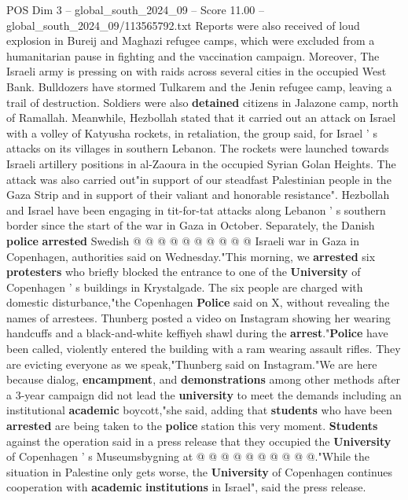 \begin{textsample}{POS Dim 3 – global\_south\_2024\_09 – Score 11.00 – global\_south\_2024\_09/113565792.txt}  \label{ex:f3_pos_329}
Reports were also received of loud explosion in Bureij and Maghazi refugee camps, which were excluded from a humanitarian pause in fighting and the vaccination campaign.
Moreover, The Israeli army is pressing on with raids across several cities in the occupied West Bank.
Bulldozers have stormed Tulkarem and the Jenin refugee camp, leaving a trail of destruction.
Soldiers were also \textbf{detained} citizens in Jalazone camp, north of Ramallah.
Meanwhile, Hezbollah stated that it carried out an attack on Israel with a volley of Katyusha rockets, in retaliation, the group said, for Israel ' s attacks on its villages in southern Lebanon.
The rockets were launched towards Israeli artillery positions in al-Zaoura in the occupied Syrian Golan Heights.
The attack was also carried out"in support of our steadfast Palestinian people in the Gaza Strip and in support of their valiant and honorable resistance".
Hezbollah and Israel have been engaging in tit-for-tat attacks along Lebanon ' s southern border since the start of the war in Gaza in October.
Separately, the Danish \textbf{police} \textbf{arrested} Swedish @ @ @ @ @ @ @ @ @ @ Israeli war in Gaza in Copenhagen, authorities said on Wednesday."This morning, we \textbf{arrested} six \textbf{protesters} who briefly blocked the entrance to one of the \textbf{University} of Copenhagen ' s buildings in Krystalgade.
The six people are charged with domestic disturbance,"the Copenhagen \textbf{Police} said on X, without revealing the names of arrestees.
Thunberg posted a video on Instagram showing her wearing handcuffs and a black-and-white keffiyeh shawl during the \textbf{arrest}."\textbf{Police} have been called, violently entered the building with a ram wearing assault rifles.
They are evicting everyone as we speak,"Thunberg said on Instagram."We are here because dialog, \textbf{encampment}, and \textbf{demonstrations} among other methods after a 3-year campaign did not lead the \textbf{university} to meet the demands including an institutional \textbf{academic} boycott,"she said, adding that \textbf{students} who have been \textbf{arrested} are being taken to the \textbf{police} station this very moment. \textbf{Students} against the operation said in a press release that they occupied the \textbf{University} of Copenhagen ' s Museumsbygning at @ @ @ @ @ @ @ @ @ @."While the situation in Palestine only gets worse, the \textbf{University} of Copenhagen continues cooperation with \textbf{academic} \textbf{institutions} in Israel", said the press release.

\end{textsample}
